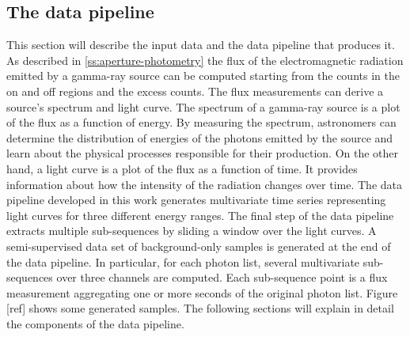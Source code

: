 \subsection{The data pipeline}
\label{ss:data-pipeline}
This section will describe the input data and the data pipeline that produces it. As described in \autoref{ss:aperture-photometry} the flux of the electromagnetic radiation emitted by a gamma-ray source can be computed starting from the counts in the on and off regions and the excess counts. The flux measurements can derive a source's spectrum and light curve. The spectrum of a gamma-ray source is a plot of the flux as a function of energy. By measuring the spectrum, astronomers can determine the distribution of energies of the photons emitted by the source and learn about the physical processes responsible for their production. On the other hand, a light curve is a plot of the flux as a function of time. It provides information about how the intensity of the radiation changes over time. The data pipeline developed in this work generates multivariate time series representing light curves for three different energy ranges. The final step of the data pipeline extracts multiple sub-sequences by sliding a window over the light curves. 
A semi-supervised data set of background-only samples is generated at the end of the data pipeline. In particular, for each photon list, several multivariate sub-sequences over three channels are computed. Each sub-sequence point is a flux measurement aggregating one or more seconds of the original photon list. Figure [ref] shows some generated samples. The following sections will explain in detail the components of the data pipeline.

